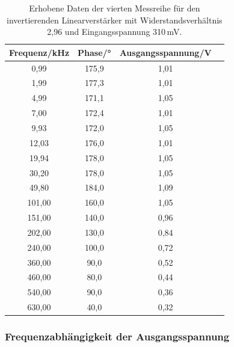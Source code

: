                 \begin{table}
                    \centering
                    \caption{Erhobene Daten der vierten Messreihe für den invertierenden Linearverstärker 
                    mit Widerstandsverhältnis 2,96 und Eingangsspannung 310\,mV.}
                    \label{tab:inv5}
                    \begin{tabular}{c c c c}
                        \toprule
                            Frequenz/kHz & Phase/° & Ausgangsspannung/V \\
                        \midrule
                              0,99 & 175,9 & 1,01\\
                              1,99 & 177,3 & 1,01\\
                              4,99 & 171,1 & 1,05\\
                              7,00 & 172,4 & 1,01\\
                              9,93 & 172,0 & 1,05\\
                             12,03 & 176,0 & 1,01\\
                             19,94 & 178,0 & 1,05\\
                             30,20 & 178,0 & 1,05\\
                             49,80 & 184,0 & 1,09\\
                            101,00 & 160,0 & 1,05\\
                            151,00 & 140,0 & 0,96\\
                            202,00 & 130,0 & 0,84\\
                            240,00 & 100,0 & 0,72\\
                            360,00 &  90,0 & 0,52\\
                            460,00 &  80,0 & 0,44\\
                            540,00 &  90,0 & 0,36\\
                            630,00 &  40,0 & 0,32\\
                        \bottomrule
                    \end{tabular}
                \end{table}            
            

            \subsubsection{Frequenzabhängigkeit der Ausgangsspannung}

